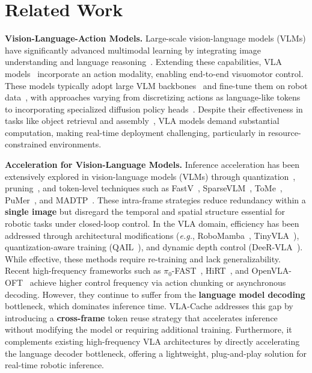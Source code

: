 \section{Related Work}
\textbf{Vision-Language-Action Models.}
Large-scale vision-language models (VLMs) have significantly advanced multimodal learning by integrating image understanding and language reasoning~\cite{liu2024visual, bai2023qwen}. Extending these capabilities, VLA models~\cite{zitkovich2023rt,li2023vision} incorporate an action modality, enabling end-to-end visuomotor control. These models typically adopt large VLM backbones~\cite{touvron2023llama} and fine-tune them on robot data~\cite{o2024open}, with approaches varying from discretizing actions as language-like tokens~\cite{kim24openvla, chi2023diffusion} to incorporating specialized diffusion policy heads~\cite{black2024pi_0}. Despite their effectiveness in tasks like object retrieval and assembly~\cite{huang2024rekep, zhao2023learning}, VLA models demand substantial computation, making real-time deployment challenging, particularly in resource-constrained environments.

\textbf{Acceleration for Vision-Language Models.}
Inference acceleration has been extensively explored in vision-language models (VLMs) through quantization~\cite{10.1145/3664647.3680838}, pruning~\cite{lin2024mope}, and token-level techniques such as FastV~\cite{chen2025image}, SparseVLM~\cite{zhang2024sparsevlm}, ToMe~\cite{bolya2022token}, PuMer~\cite{cao2023pumer}, and MADTP~\cite{cao2024madtp}. These intra-frame strategies reduce redundancy within a \textbf{single image} but disregard the temporal and spatial structure essential for robotic tasks under closed-loop control. In the VLA domain, efficiency has been addressed through architectural modifications (\textit{e.g.}, RoboMamba~\cite{liu2024robomamba}, TinyVLA~\cite{wen2024tinyvla}), quantization-aware training (QAIL~\cite{park2024quantization}), and dynamic depth control (DeeR-VLA~\cite{DeeR-VLA}). While effective, these methods require re-training and lack generalizability. Recent high-frequency frameworks such as $\pi_0$-FAST~\cite{pertsch2025fast}, HiRT~\cite{zhang2024hirt}, and OpenVLA-OFT~\cite{kim2025fine} achieve higher control frequency via action chunking or asynchronous decoding. However, they continue to suffer from the \textbf{language model decoding} bottleneck, which dominates inference time. VLA-Cache addresses this gap by introducing a \textbf{cross-frame} token reuse strategy that accelerates inference without modifying the model or requiring additional training. Furthermore, it complements existing high-frequency VLA architectures by directly accelerating the language decoder bottleneck, offering a lightweight, plug-and-play solution for real-time robotic inference.
